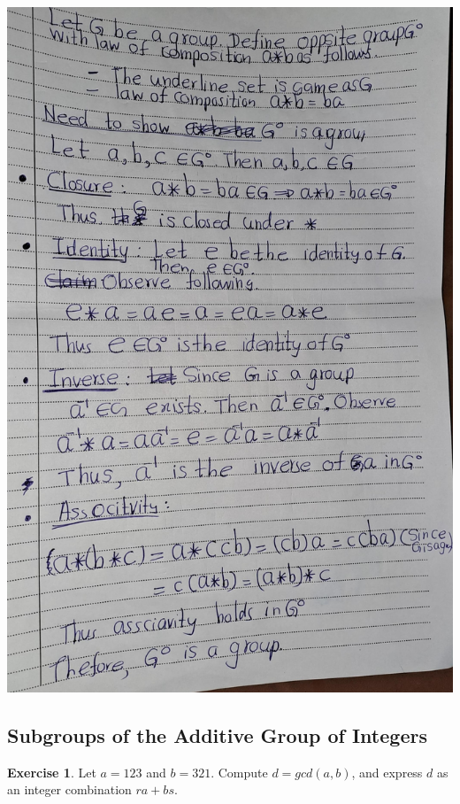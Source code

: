 \documentclass[
]{book}
\theoremstyle{definition}
\theoremstyle{definition}
\theoremstyle{definition}
\newtheorem{exercise}{Exercise}[chapter]
\theoremstyle{definition}
\theoremstyle{remark}
\begin{document}
\includegraphics{figures/ch_2/fig19.jpg}

\hypertarget{subgroups-of-the-additive-group-of-integers-1}{%
\subsection{Subgroups of the Additive Group of Integers}\label{subgroups-of-the-additive-group-of-integers-1}}

\begin{exercise}
\protect\hypertarget{exr:unnamed-chunk-68}{}\label{exr:unnamed-chunk-68}Let \(a = 123\) and \(b = 321\).
Compute \(d = gcd(a, b)\), and express \(d\) as an integer
combination \(ra + bs\).
\end{exercise}
\end{document}
